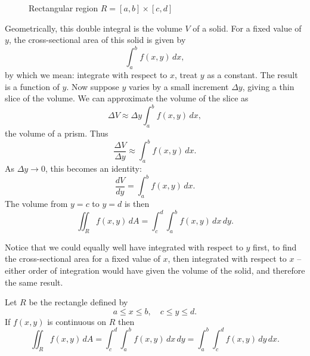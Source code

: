   \begin{figure}[H]
    \centering
    \def\svgwidth{0.45\columnwidth}
    
    \caption{Rectangular region $R = [a, b] \times [c, d]$}
    \label{rectangularregion2}
  \end{figure}
	
	Geometrically, this double integral is the volume $V$ of a solid. 	For a fixed value of $y$, the cross-sectional area of this solid is given by
    \[
      \int_a^b f(x, y) \, dx,
    \]
	by which we mean: integrate with respect to $x$, treat $y$ as a constant.  The result is a function of $y$.  Now suppose $y$ varies by a small increment $\Delta y$, giving a thin slice of the volume.  We can approximate the volume of the slice as
	  \[
		  \Delta V \approx \Delta y \int_a^b f(x, y) \, dx,
		\]
	the volume of a prism.  Thus
	  \[
		  \frac{\Delta V}{\Delta y} \approx \int_a^b f(x, y) \, dx.
		\]
	As $\Delta y \to 0$, this becomes an identity:
	  \[
		  \frac{dV}{dy} = \int_a^b f(x, y) \, dx.
		\]
	The volume from $y = c$ to $y = d$ is then
	  \[
		  \iint_R f(x, y) \, dA = \int_c^d \int_a^b f(x, y) \, dx \, dy.
		\]
		
	Notice that we could equally well have integrated with respect to $y$ first, to find the cross-sectional area for a fixed value of $x$, then integrated with respect to $x$ -- either order of integration would have given the volume of the solid, and therefore the same result.
	
	  \begin{theorem}
    Let $R$ be the rectangle defined by
      \[
        a \leq x \leq b, \quad c \leq y \leq d.
      \]
    If $f(x, y)$ is continuous on $R$ then
    \[
      \iint_R f(x, y) \, dA = \int_c^d \int_a^b f(x, y) \, dx \, dy = \int_a^b \int_c^d f(x, y) \, dy \, dx.
    \]
  \end{theorem}


